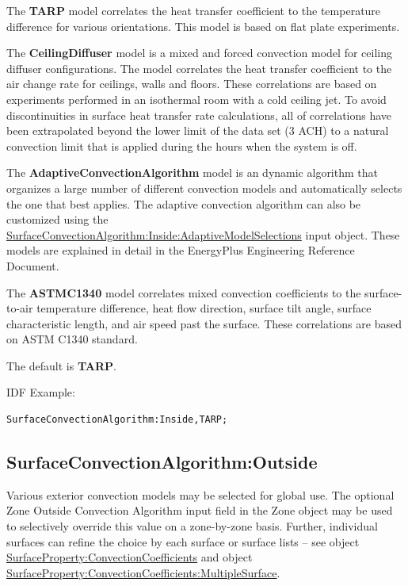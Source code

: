 The \textbf{TARP} model correlates the heat transfer coefficient to the temperature difference for various orientations. This model is based on flat plate experiments.

The \textbf{CeilingDiffuser} model is a mixed and forced convection model for ceiling diffuser configurations. The model correlates the heat transfer coefficient to the air change rate for ceilings, walls and floors. These correlations are based on experiments performed in an isothermal room with a cold ceiling jet. To avoid discontinuities in surface heat transfer rate calculations, all of correlations have been extrapolated beyond the lower limit of the data set (3 ACH) to a natural convection limit that is applied during the hours when the system is off.

The \textbf{AdaptiveConvectionAlgorithm} model is an dynamic algorithm that organizes a large number of different convection models and automatically selects the one that best applies. The adaptive convection algorithm can also be customized using the \hyperref[surfaceconvectionalgorithminsideadaptivemodelselections]{SurfaceConvectionAlgorithm:Inside:AdaptiveModelSelections} input object. These models are explained in detail in the EnergyPlus Engineering Reference Document.

The \textbf{ASTMC1340} model correlates mixed convection coefficients to the surface-to-air temperature difference, heat flow direction, surface tilt angle, surface characteristic length, and air speed past the surface. These correlations are based on ASTM C1340 standard.

The default is \textbf{TARP}.

IDF Example:

\begin{lstlisting}
SurfaceConvectionAlgorithm:Inside,TARP;
\end{lstlisting}

\subsection{SurfaceConvectionAlgorithm:Outside}\label{surfaceconvectionalgorithmoutside}

Various exterior convection models may be selected for global use. The optional Zone Outside Convection Algorithm input field in the Zone object may be used to selectively override this value on a zone-by-zone basis. Further, individual surfaces can refine the choice by each surface or surface lists -- see object \hyperref[surfacepropertyconvectioncoefficients]{SurfaceProperty:ConvectionCoefficients} and object \hyperref[surfacepropertyconvectioncoefficientsmultiplesurface]{SurfaceProperty:ConvectionCoefficients:MultipleSurface}.

